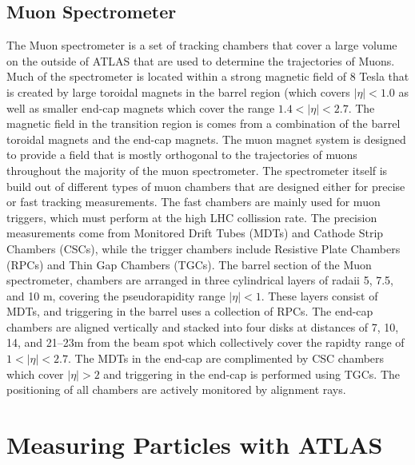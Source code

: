 \subsection{Muon Spectrometer}
The Muon spectrometer is a set of tracking chambers that cover a large volume on the outside of ATLAS that are used to determine the trajectories of Muons.
Much of the spectrometer is located within a strong magnetic field of 8 Tesla that is created by large toroidal magnets in the barrel region (which covers $|\eta| < 1.0$ as well as smaller end-cap magnets which cover the range $1.4 < |\eta| < 2.7$. 
The magnetic field in the transition region is comes from a combination of the barrel toroidal magnets and the end-cap magnets.
The muon magnet system is designed to provide a field that is mostly orthogonal to the trajectories of muons throughout the majority of the muon spectrometer.
The spectrometer itself is build out of different types of muon chambers that are designed either for precise or fast tracking measurements.
The fast chambers are mainly used for muon triggers, which must perform at the high LHC collission rate.
The precision measurements come from Monitored Drift Tubes (MDTs) and Cathode Strip Chambers (CSCs), while the trigger chambers include Resistive Plate Chambers (RPCs) and Thin Gap Chambers (TGCs).
The barrel section of the Muon spectrometer, chambers are arranged in three cylindrical layers of radaii 5, 7.5, and 10 m, covering the pseudorapidity range $|\eta| < 1$.
These layers consist of MDTs, and triggering in the barrel uses a collection of RPCs.
The end-cap chambers are aligned vertically and stacked into four disks at distances of 7, 10, 14, and 21–23m from the beam spot which collectively cover the rapidty range of $1 <|\eta|< 2.7$. 
The MDTs in the end-cap are complimented by CSC chambers which cover $|\eta| > 2$ and triggering in the end-cap is performed using TGCs.
The positioning of all chambers are actively monitored by alignment rays.


\section{Measuring Particles with ATLAS}


